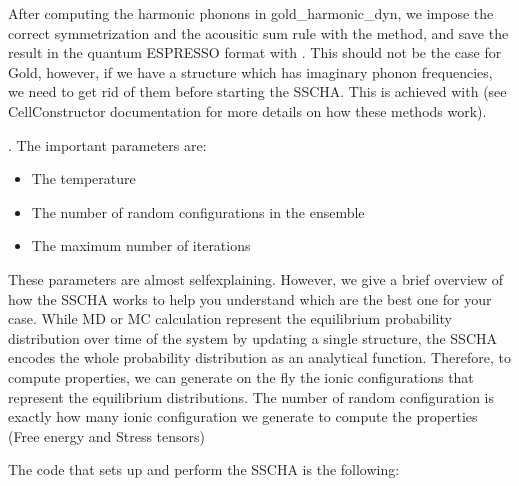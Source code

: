 \documentclass[a4paper,11pt,english]{sphinxmanual}
\begin{document}
\sphinxAtStartPar
After computing the harmonic phonons in gold\_harmonic\_dyn, we impose the correct symmetrization and the acousitic sum rule with the  method, and save the result in the quantum ESPRESSO format with .
This should not be the case for Gold, however, if we have a structure which has imaginary phonon frequencies, we need to get rid of them before starting the SSCHA. This is achieved with  (see CellConstructor documentation for more details on how these methods work).

\sphinxAtStartPar
{}.
The important parameters are:
\begin{itemize}
\item {} 
\sphinxAtStartPar
The temperature

\item {} 
\sphinxAtStartPar
The number of random configurations in the ensemble

\item {} 
\sphinxAtStartPar
The maximum number of iterations

\end{itemize}

\sphinxAtStartPar
These parameters are almost self\sphinxhyphen{}explaining. However, we give a brief overview of how the SSCHA works to help you understand which are the best one for your case.
While MD or MC calculation represent the equilibrium probability distribution over time of the system by updating a single structure, the SSCHA encodes the whole probability distribution as an analytical function. Therefore, to compute properties, we can generate on the fly the ionic configurations that represent the equilibrium distributions.
The number of random configuration is exactly how many ionic configuration we generate to compute the properties (Free energy and Stress tensors)

\sphinxAtStartPar
The code that sets up and perform the SSCHA is the following:
\end{document}
